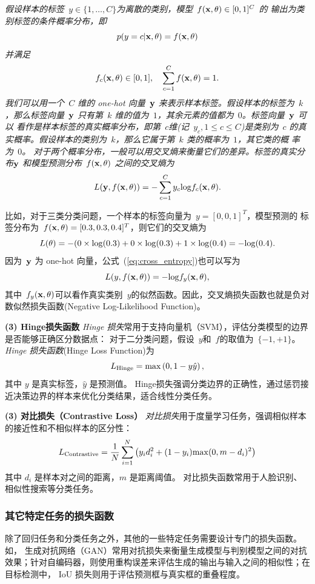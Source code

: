 {\em 假设样本的标签~$y \in \{1, \dots, C\}$为离散的类别，模型~$f({\bf x},\theta) \in [0, 1]^C$ 的 输出为类别标签的条件概率分布，即
$$
p(y=c|{\bf x}, \theta)=f({\bf x},\theta)
$$
并满足
$$
f_c({\bf x},\theta)\in [0,1], \quad \sum_{c=1}^C f({\bf x},\theta)=1.
$$
我们可以用一个~$C$ 维的 one-hot 向量~${\bf  y}$ 来表示样本标签。假设样本的标签为~$k$，那么标签向量~${\bf y}$ 只有第~$k$ 维的值为~$1$，其余元素的值都为~$0$。标签向量~${\bf y}$ 可以 看作是样本标签的真实概率分布，即第~$c$维(记~$y_c, 1 \le c \le C$)是类别为~$c$ 的真实概率。假设样本的类别为~$k$，那么它属于第~$k$ 类的概率为~$1$，其它类的概 率为~$0$。
对于两个概率分布，一般可以用交叉熵来衡量它们的差异。标签的真实分 布${\bf y}$ 和模型预测分布~$f({\bf x},\theta)$ 之间的交叉熵为
\begin{equation}\label{eq:cross_entropy}
L({\bf y}, f({\bf x},\theta))=-\sum_{c=1}^C y_c {\rm log} f_c({\bf x},\theta).
\end{equation}

比如，对于三类分类问题，一个样本的标签向量为~$y = [0,0,1]^T$，模型预测的 标签分布为~$f({\bf x},\theta) = [0.3, 0.3, 0.4]^T$，则它们的交叉熵为
$$
L(\theta) = -( 0 \times {\rm log}(0.3)+0\times {\rm log}(0.3)+1\times {\rm log}(0.4)= -{\rm log}(0.4).
$$
因为~$ {\bf y}$ 为 one-hot 向量，公式~(\ref{eq:cross_entropy})也可以写为
$$ L(y, f({\bf x},\theta)) = - {\rm log} f_y({\bf x},\theta),$$
其中~$ f_y({\bf x},\theta)$可以看作真实类别~$y$的似然函数。因此，交叉熵损失函数也就是负对数似然损失函数(Negative Log-Likelihood Function)。}

{\bf (3) Hinge损失函数} 
{\em Hinge 损失}常用于支持向量机（SVM），评估分类模型的边界是否能够正确区分数据点：
对于二分类问题，假设~$y$和~$f$的取值为~$\{-1,+1\}$。{\em Hinge
损失函数}(Hinge Loss Function)为
$$
L_{\rm Hinge} = {\rm max} \left(0, 1 - y\hat{y}\right), %
$$
其中 $y$ 是真实标签，$\hat{y}$ 是预测值。
Hinge损失强调分类边界的正确性，通过惩罚接近决策边界的样本来优化分类结果，适合线性分类任务。

{\bf (3) 对比损失（Contrastive Loss）} {\em 对比损失}用于度量学习任务，强调相似样本的接近性和不相似样本的区分性：
$$
L_{\rm Contrastive} = \frac{1}{N} \sum_{i=1}^N \left( y_i d_i^2+(1-y_i){\rm max}(0, m-d_i)^2\right)
$$
其中 $d_i$ 是样本对之间的距离，$m$ 是距离阈值。
对比损失函数常用于人脸识别、相似性搜索等分类任务。

\subsubsection*{其它特定任务的损失函数}
除了回归任务和分类任务之外，其他的一些特定任务需要设计专门的损失函数。如，
生成对抗网络（GAN）常用对抗损失来衡量生成模型与判别模型之间的对抗效果；针对自编码器，则使用重构误差来评估生成的输出与输入之间的相似性；在目标检测中， IoU 损失则用于评估预测框与真实框的重叠程度。

